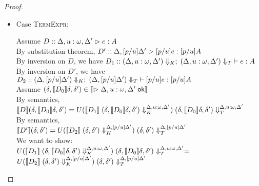 \begin{proof}
\begin{enumerate}
\begin{itemize}
  \item Case \textsc{TermExpr}: 
    \begin{tabbedproof}
      \oo Assume $D :: \judgeA[{\Delta, u:\omega, \Delta'}]{e}{A}$ \\
      \oo By substitution theorem, $D' :: \judgeA[{\Delta, [p/u]\Delta'}]{[p/u]e}{[p/u]A}$ \\
      \oo By inversion on $D$, we have 
           $D_1 :: \judgeE[\restrictkind{\Delta, u:\omega, \Delta'}]{\restricttype{\Delta, u:\omega, \Delta'}}{e}{A}$ \\
      \oo By inversion on $D'$, we have
           $D_2 :: \judgeE[\restrictkind{\Delta, [p/u]\Delta'}]{\restricttype{\Delta, [p/u]\Delta'}}{[p/u]e}{[p/u]A}$ \\
      \oo Assume $(\delta, \interp{D_0}\delta, \delta') \in 
                   \interp{\judgeACtx{\Delta, u:\omega, \Delta'}}$ \\
      \oo By semantics, \\
      \ox $\interp{D}(\delta, \interp{D_0}\delta, \delta') = 
             U(\interp{D_1}\;\restricttyenv{\Delta, u:\omega, \Delta'}
                                           {(\delta, \interp{D_0}\delta, \delta')})
             \;\restrictvals{\Delta, u:\omega, \Delta'}{(\delta, \interp{D_0}\delta, \delta')}$\\
      \oo By semantics, \\
      \ox $\interp{D'}(\delta, \delta') = 
             U(\interp{D_2}\;\restricttyenv{\Delta, [p/u]\Delta'}
                                           {(\delta, \delta')})
             \;\restrictvals{\Delta, [p/u]\Delta'}{(\delta, \delta')}$\\
      \oo We want to show:\\
      \ox $U(\interp{D_1}\;\restricttyenv{\Delta, u:\omega, \Delta'}
                                           {(\delta, \interp{D_0}\delta, \delta')})
             \;\restrictvals{\Delta, u:\omega, \Delta'}{(\delta, \interp{D_0}\delta, \delta')}
             =$ \\
      \ox $U(\interp{D_2}\;\restricttyenv{\Delta, [p/u]\Delta'}
                                           {(\delta, \delta')})
             \;\restrictvals{\Delta, [p/u]\Delta'}{(\delta, \delta')}$\\


\end{tabbedproof}
\end{itemize}
\end{enumerate}
\end{proof}
